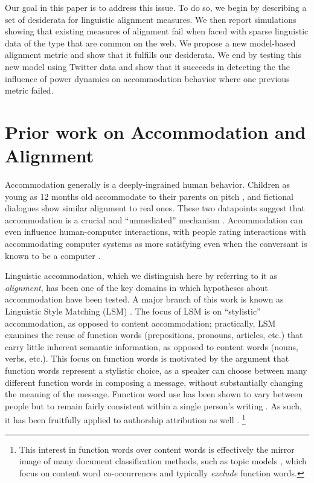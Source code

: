 \documentclass{acm_proc_article-sp}
\begin{document}
Our goal in this paper is to address this issue. To do so, we begin by describing a set of desiderata for linguistic alignment measures. We then report simulations showing that existing measures of alignment fail when faced with sparse linguistic data of the type that are common on the web. We propose a new model-based alignment metric and show that it fulfills our desiderata. We end by testing this new model using Twitter data and show that it succeeds in detecting the the influence of power dynamics on accommodation behavior where one previous metric failed. 

\section{Prior work on Accommodation and Alignment}

Accommodation generally is a deeply-ingrained human behavior.  Children as young as 12 months old accommodate to their parents on pitch \cite{Lieberman1967}, and fictional dialogues show similar alignment to real ones. These two datapoints suggest that accommodation is a crucial and ``unmediated'' mechanism \cite{PickeringGarrod2004,DNMLee2011}.  Accommodation can even influence human-computer interactions, with people rating interactions with accommodating computer systems as more satisfying even when the conversant is known to be a computer \cite{NassLee2000,vanBaarenEtAl2003,BraniganEtAl2010}.

Linguistic accommodation, which we distinguish here by referring to it as \emph{alignment}, has been one of the key domains in which hypotheses about accommodation have been tested. A major branch of this work is known as Linguistic Style Matching (LSM) \cite{NiederhofferPennebaker2002,IrelandEtAl2011}.  The focus of LSM is on ``stylistic'' accommodation, as opposed to content accommodation; practically, LSM examines the reuse of function words (prepositions, pronouns, articles, etc.) that carry little inherent semantic information, as opposed to content words (nouns, verbs, etc.). This focus on function words is motivated by the argument that function words represent a stylistic choice, as a speaker can choose between many different function words in composing a message, without substantially changing the meaning of the message.  Function word use has been shown to vary between people but to remain fairly consistent within a single person's writing \cite{PennebakerKing1999}. As such, it has been fruitfully applied to authorship attribution as well \cite{boyd2015}. \footnote{This interest in function words over content words is effectively the mirror image of many document classification methods, such as topic models \cite{BleiNgJordan2003}, which focus on content word co-occurrences and typically \emph{exclude} function words.}
\end{document}
